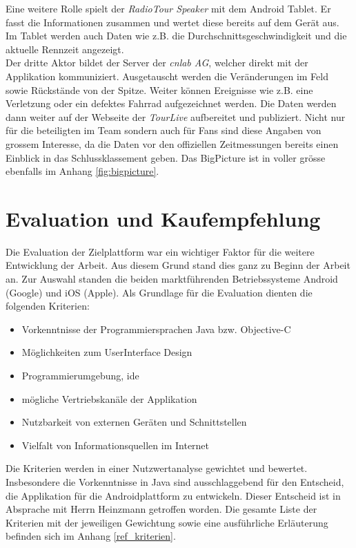 Eine weitere Rolle spielt der \textit{RadioTour Speaker} mit dem Android Tablet. Er fasst die Informationen zusammen und wertet diese bereits auf dem Gerät aus. Im Tablet werden auch Daten wie z.B. die Durchschnittsgeschwindigkeit und die aktuelle Rennzeit angezeigt.
\\

Der dritte Aktor bildet der Server der \textit{cnlab AG}, welcher direkt mit der Applikation kommuniziert. Ausgetauscht werden die Veränderungen im Feld sowie Rückstände von der Spitze. Weiter können Ereignisse wie z.B. eine Verletzung oder ein defektes Fahrrad aufgezeichnet werden. Die Daten werden dann weiter auf der Webseite der \textit{TourLive} aufbereitet und publiziert. Nicht nur für die beteiligten im Team sondern auch für Fans sind diese Angaben von grossem Interesse, da die Daten vor den offiziellen Zeitmessungen bereits einen Einblick in das Schlussklassement geben. Das BigPicture ist in voller grösse ebenfalls im Anhang \ref{fig:bigpicture}.

\section{Evaluation und Kaufempfehlung}
\label{kap:kaufempfehlung}
Die Evaluation der Zielplattform war ein wichtiger Faktor für die weitere Entwicklung der Arbeit. Aus diesem Grund stand dies ganz zu Beginn der Arbeit an. Zur Auswahl standen die beiden marktführenden Betriebssysteme Android (Google) und iOS (Apple). Als Grundlage für die Evaluation dienten die folgenden Kriterien:
\begin{itemize}
\item Vorkenntnisse der Programmiersprachen Java bzw. Objective-C
\item Möglichkeiten zum UserInterface Design
\item Programmierumgebung, \gls{ide}
\item mögliche Vertriebskanäle der Applikation
\item Nutzbarkeit von externen Geräten und Schnittstellen
\item Vielfalt von Informationsquellen im Internet
\end{itemize}
Die Kriterien werden in einer Nutzwertanalyse gewichtet und bewertet. Insbesondere die Vorkenntnisse in Java sind  ausschlaggebend für den Entscheid, die Applikation für die Androidplattform zu entwickeln. Dieser Entscheid ist in Absprache mit Herrn Heinzmann getroffen worden. Die gesamte Liste der Kriterien mit der jeweiligen Gewichtung sowie eine ausführliche Erläuterung befinden sich im Anhang \ref{ref_kriterien}.
\\

